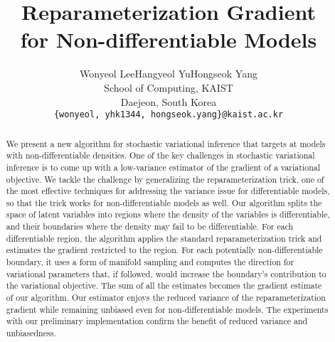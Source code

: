 \documentclass{article}
\title{Reparameterization Gradient \\
for Non-differentiable Models}
\author{
  Wonyeol Lee\quad\quad Hangyeol Yu\quad\quad Hongseok Yang\\
  School of Computing, KAIST\\
  Daejeon, South Korea\\
  \texttt{\{wonyeol, yhk1344, hongseok.yang\}@kaist.ac.kr}\\
}
\begin{document}

\maketitle

\begin{abstract}
We present a new algorithm for stochastic variational inference that targets at models with non-differentiable densities. One of the key challenges in stochastic variational inference is to come up with a low-variance estimator of the gradient of a variational objective. We tackle the challenge by generalizing the reparameterization trick, one of the most effective techniques for addressing the variance issue for differentiable models, so that the trick works for non-differentiable models as well. Our algorithm splits the space of latent variables into regions where the density of the variables is differentiable, and their boundaries where the density may fail to be differentiable. For each differentiable region, the algorithm applies the standard reparameterization trick and estimates the gradient restricted to the region. For each potentially non-differentiable boundary, it uses a form of manifold sampling and computes the direction for variational parameters that, if followed, would increase the boundary's contribution to the variational objective. The sum of all the estimates becomes the gradient estimate of our algorithm. Our estimator enjoys the reduced variance of the reparameterization gradient while remaining unbiased even for non-differentiable models. The experiments with our preliminary implementation confirm the benefit of reduced variance and unbiasedness. 
\end{abstract}











\newpage 

\appendix

%
%
\end{document}
